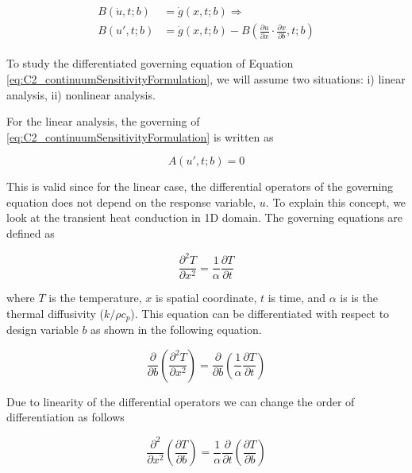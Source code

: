 \begin{align}\label{eq:C2_linearSAboundaryCondtions}
\begin{split}
	B(\dot{u}, t; b) &= \dot{g}(x, t; b) \Rightarrow \\
	B(u', t; b) &= \dot{g}(x, t; b) - B(\frac{\partial u}{\partial x} \cdot \frac{\partial x}{\partial b}, t; b)
\end{split}
\end{align}

To study the differentiated governing equation of Equation \eqref{eq:C2_continuumSensitivityFormulation}, we will assume two situations: i) linear analysis, ii) nonlinear analysis.

For the linear analysis, the governing  of \eqref{eq:C2_continuumSensitivityFormulation} is written as

\begin{equation}\label{eq:C2_linearSAgoverningEquation}
	A(u', t; b) = 0 
\end{equation}

This is valid since for the linear case, the differential operators of the governing equation does not depend on the response variable, $u$. To explain this concept, we look at the transient heat conduction in 1D domain. The governing equations are defined as

\begin{equation}\label{eq:C2_transientHeatCondtionGE}
	\frac{\partial^2 T}{\partial x^2} = \frac{1}{\alpha} \frac{\partial T}{\partial t}
\end{equation}

where $T$ is the temperature, $x$ is spatial coordinate, $t$ is time, and $\alpha$ is is the thermal diffusivity ($k/\rho c_p$). This equation can be differentiated with respect to design variable $b$ as shown in the following equation.

\begin{equation*}
	\frac{\partial}{\partial b}
	\left( \frac{\partial^2 T}{\partial x^2}\right) = 
	\frac{\partial}{\partial b}
	\left( \frac{1}{\alpha} \frac{\partial T}{\partial t}\right)
\end{equation*}

Due to linearity of the differential operators we can change the order of differentiation as follows

\begin{equation}\label{eq:C2_transientHeatCondtionSA}
	\frac{\partial^2}{\partial x^2}
	\left( \frac{\partial T}{\partial b} \right) = 
	\frac{1}{\alpha} \frac{\partial}{\partial t}
	\left( \frac{\partial T}{\partial b}\right)
\end{equation}

